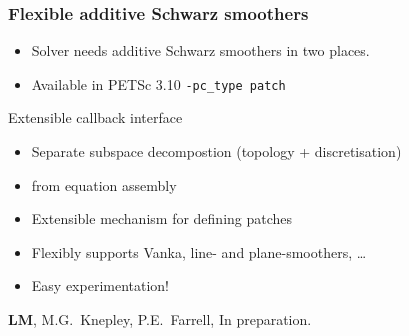 \documentclass[presentation]{beamer}
\begin{document}
\begin{frame}
  \frametitle{Flexible additive Schwarz smoothers}
  \begin{itemize}
  \item Solver needs additive Schwarz smoothers in two places.
  \item Available in PETSc 3.10 \texttt{-pc\_type patch}
  \end{itemize}
  \begin{block}{Extensible callback interface}
    \begin{itemize}
    \item Separate subspace decompostion (topology + discretisation)
    \item from equation assembly
    \item Extensible mechanism for defining patches
    \item Flexibly supports Vanka, line- and plane-smoothers, \dots
    \item Easy experimentation!
    \end{itemize}
  \end{block}
  \begin{flushright}
    {\scriptsize \textbf{LM}, M.G.~Knepley, P.E.~Farrell, In preparation.}
  \end{flushright}
\end{frame}
\end{document}
